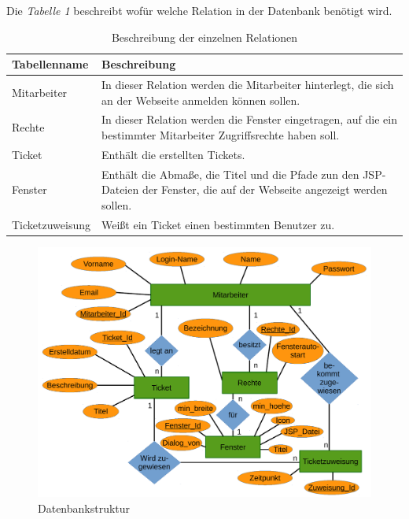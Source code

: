 \documentclass[12pt, a4paper]{article}
\begin{document}
Die \textit{Tabelle 1} beschreibt wofür welche Relation in der Datenbank benötigt wird.
\begin{table}[H]
	\begin{center}
		\begin{tabular}{|p{3cm}|p{10cm}|}
			\hline 
				\cellcolor{Hellgrau}Tabellenname & \cellcolor{Hellgrau}Beschreibung \\ 
			\hline 
				Mitarbeiter & In dieser Relation werden die Mitarbeiter hinterlegt, die sich an der Webseite anmelden können sollen.\\ 
			\hline
				Rechte & In dieser Relation werden die Fenster eingetragen, auf die ein bestimmter Mitarbeiter Zugriffsrechte haben soll.\\ 
			\hline
				Ticket & Enthält die erstellten Tickets.\\ 
			\hline
				Fenster & Enthält die Abmaße, die Titel und die Pfade zun den JSP-Dateien der Fenster, die auf der Webseite angezeigt werden sollen.\\ 
			\hline
				Ticketzuweisung & Weißt ein Ticket einen bestimmten Benutzer zu.\\ 
			\hline
		\end{tabular}
	\end{center}
	\caption{Beschreibung der einzelnen Relationen}
\end{table}

\begin{figure}[H]
	\begin{center}
		\includegraphics[width=120mm]{Bilder/erd.pdf}
	\end{center}
	\caption{Datenbankstruktur}
\end{figure}
\end{document}
